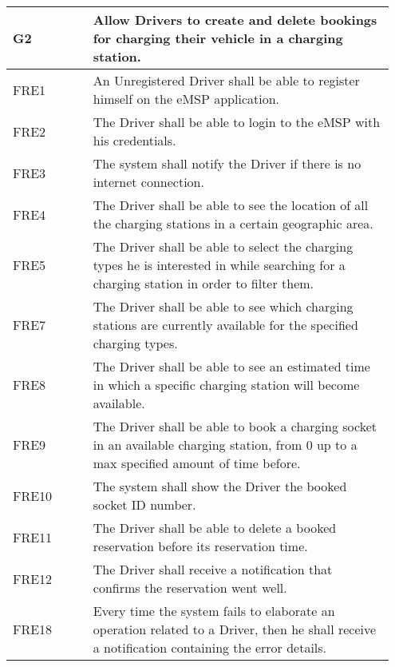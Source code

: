 {\renewcommand{\arraystretch}{1.5}
\begin{longtable}{|p{0.20\linewidth}p{0.75\linewidth}|}
    \hline
    \rowcolor{bluepoli!40}\textbf{G2} & \textbf{Allow Drivers to create and delete bookings for charging their vehicle in a charging station.} \\
    \hline
    \rowcolor{bluepoli!15} FRE1 & An Unregistered Driver shall be able to register himself on the eMSP application. \\
    \hline
    \rowcolor{bluepoli!15} FRE2 & The Driver shall be able to login to the eMSP with his credentials. \\
    \hline 
    \rowcolor{bluepoli!15} FRE3 & The system shall notify the Driver if there is no internet connection. \\
    \hline 
    \rowcolor{bluepoli!15} FRE4 & The Driver shall be able to see the location of all the charging stations in a certain geographic area. \\
    \hline 
    \rowcolor{bluepoli!15} FRE5 & The Driver shall be able to select the charging types he is interested in while searching for a charging station in order to filter them. \\
    \hline 
    \rowcolor{bluepoli!15} FRE7 & The Driver shall be able to see which charging stations are currently available for the specified charging types. \\
    \hline  
    \rowcolor{bluepoli!15} FRE8 & The Driver shall be able to see an estimated time in which a specific charging station will become available. \\
    \hline  
    \rowcolor{bluepoli!15} FRE9 & The Driver shall be able to book a charging socket in an available charging station, from 0 up to a max specified amount of time before.\\
    \hline
    \rowcolor{bluepoli!15} FRE10 & The system shall show the Driver the booked socket ID number. \\
    \hline
    \rowcolor{bluepoli!15} FRE11 &  The Driver shall be able to delete a booked reservation before its reservation time.\\
    \hline
    \rowcolor{bluepoli!15} FRE12 & The Driver shall receive a notification that confirms the reservation went well. \\
    \hline
    \rowcolor{bluepoli!15} FRE18 & Every time the system fails to elaborate an operation related to a Driver, then he shall receive a notification containing the error details. \\

\end{longtable}}
